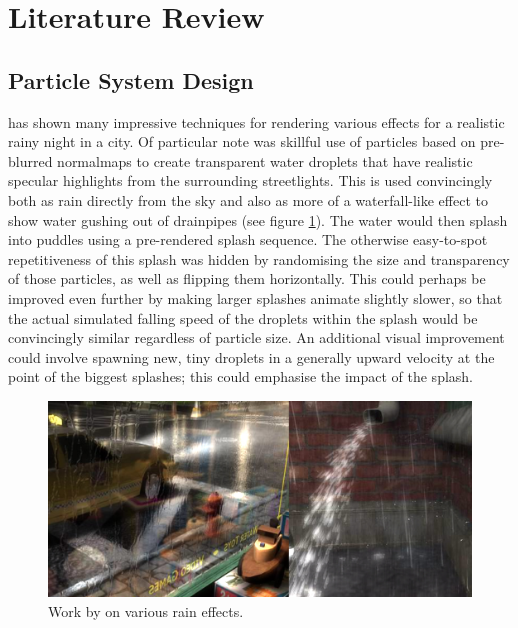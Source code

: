 \documentclass[11pt, a4paper, twocolumn]{article}
\begin{document}
\section{Literature Review}


\subsection{Particle System Design}

\citet{Tatarchuk2006} has shown many impressive techniques for rendering various effects for a realistic rainy night in a city. Of particular note was skillful use of particles based on pre-blurred normalmaps to create transparent water droplets that have realistic specular highlights from the surrounding streetlights. This is used convincingly both as rain directly from the sky and also as more of a waterfall-like effect to show water gushing out of drainpipes (see figure \ref{fig:tatarchuk}). The water would then splash into puddles using a pre-rendered splash sequence. The otherwise easy-to-spot repetitiveness of this splash was hidden by randomising the size and transparency of those particles, as well as flipping them horizontally. This could perhaps be improved even further by making larger splashes animate slightly slower, so that the actual simulated falling speed of the droplets within the splash would be convincingly similar regardless of particle size. An additional visual improvement could involve spawning new, tiny droplets in a generally upward velocity at the point of the biggest splashes; this could emphasise the impact of the splash. %

\begin{figure}[h]
\includegraphics[width=\linewidth]{tatarchuk}
\caption{Work by \citet{Tatarchuk2006} on various rain effects.}
\label{fig:tatarchuk}
\end{figure}
\end{document}
